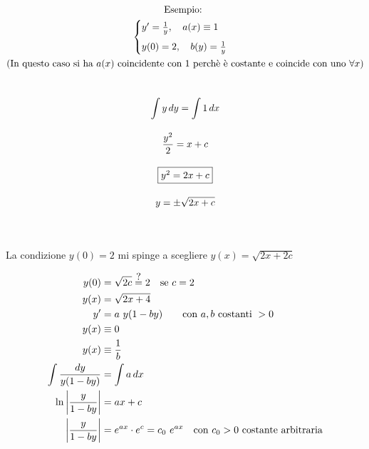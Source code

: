 \documentclass[a4paper, oneside]{article}
\newcommand\eqq{\stackrel{\mathclap{\normalfont\mbox{?}}}{=}}
\begin{document}
\begin{gather*}
    \text{Esempio: }\\
\begin{cases}
 y' = \frac{1}{y}, \quad a(x) \equiv 1 \\[6pt]
 y(0) = 2, \quad b(y) = \frac{1}{y}\\
\end{cases}
   \\ \text{(In questo caso si ha $a(x)$ coincidente con 1 perchè è costante e coincide con uno $\forall x$)}\\
\\[10pt]
\int y \, dy = \int 1 \, dx
\\[10pt]
\frac{y^2}{2} = x + c
\\[10pt]
\fbox{$y^2 = 2x + c$}
\\[10pt]
y = \pm \sqrt{2x + c}
\end{gather*}

    
    \hfil
    \\\\La condizione $y(0) = 2$ mi spinge a scegliere $y(x) = \sqrt{2x + 2c}$
    
    
\begin{align*}
        y(0) &= \sqrt{2c} \eqq 2 \quad \text{se } c = 2 \\
        y(x) &= \sqrt{2x + 4} \\
        y' &= a\ y(1 - by) \qquad \text{con } a, b \text{ costanti } > 0 \\
        y(x) &\equiv 0 \\
        y(x) &\equiv \frac{1}{b} \\
        \int \frac{dy}{y(1 - by)} &= \int a \, dx \\
        \ln{\left|\frac{y}{1 - by}\right|} &= ax + c \\
        \left|\frac{y}{1 - by}\right| &= e^{ax} \cdot e^c = c_0\ e^{ax} \quad \text{con } c_0 > 0 \text{ costante arbitraria}
\end{align*}
\end{document}
